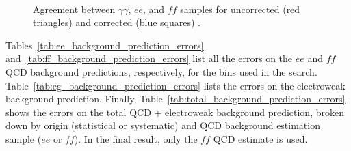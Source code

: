 \documentclass[dissertation.tex]{subfiles}
\begin{document}
\begin{figure}
	\\
	\caption{Agreement between $\gamma\gamma$, $ee$, and $\mathit{ff}$ samples for uncorrected (red triangles) and corrected (blue squares) \MET.}
	\label{fig:Type-I_MET_corrections_vs_uncorrected_MET_zoom}
\end{figure}

Tables~\ref{tab:ee_background_prediction_errors} and~\ref{tab:ff_background_prediction_errors} list all the errors on the $ee$ and $\mathit{ff}$ QCD background predictions, respectively, for the \MET bins used in the search.  Table~\ref{tab:eg_background_prediction_errors} lists the errors on the electroweak background prediction.  Finally, Table~\ref{tab:total_background_prediction_errors} shows the errors on the total QCD + electroweak background prediction, broken down by origin (statistical or systematic) and QCD background estimation sample ($ee$ or $\mathit{ff}$).  In the final result, only the $\mathit{ff}$ QCD estimate is used.
\end{document}
